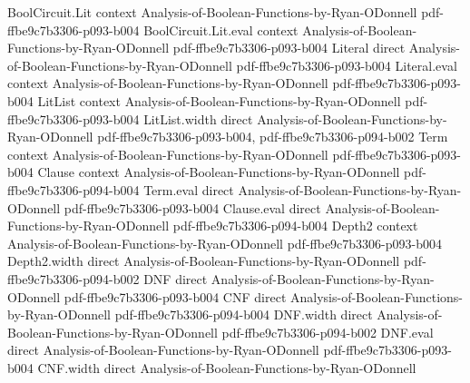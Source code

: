 \begin{lemma}
\label{BooleanAnalysis.fourierCoeff_odd_even}
\leanok
{}
\proofstep
  {BoolCircuit.Lit}
  {context}
  {Analysis-of-Boolean-Functions-by-Ryan-ODonnell}
  {pdf-ffbe9c7b3306-p093-b004}
\proofstep
  {BoolCircuit.Lit.eval}
  {context}
  {Analysis-of-Boolean-Functions-by-Ryan-ODonnell}
  {pdf-ffbe9c7b3306-p093-b004}
\proofstep
  {Literal}
  {direct}
  {Analysis-of-Boolean-Functions-by-Ryan-ODonnell}
  {pdf-ffbe9c7b3306-p093-b004}
\proofstep
  {Literal.eval}
  {context}
  {Analysis-of-Boolean-Functions-by-Ryan-ODonnell}
  {pdf-ffbe9c7b3306-p093-b004}
\proofstep
  {LitList}
  {context}
  {Analysis-of-Boolean-Functions-by-Ryan-ODonnell}
  {pdf-ffbe9c7b3306-p093-b004}
\proofstep
  {LitList.width}
  {direct}
  {Analysis-of-Boolean-Functions-by-Ryan-ODonnell}
  {pdf-ffbe9c7b3306-p093-b004,
    pdf-ffbe9c7b3306-p094-b002}
\proofstep
  {Term}
  {context}
  {Analysis-of-Boolean-Functions-by-Ryan-ODonnell}
  {pdf-ffbe9c7b3306-p093-b004}
\proofstep
  {Clause}
  {context}
  {Analysis-of-Boolean-Functions-by-Ryan-ODonnell}
  {pdf-ffbe9c7b3306-p094-b004}
\proofstep
  {Term.eval}
  {direct}
  {Analysis-of-Boolean-Functions-by-Ryan-ODonnell}
  {pdf-ffbe9c7b3306-p093-b004}
\proofstep
  {Clause.eval}
  {direct}
  {Analysis-of-Boolean-Functions-by-Ryan-ODonnell}
  {pdf-ffbe9c7b3306-p094-b004}
\proofstep
  {Depth2}
  {context}
  {Analysis-of-Boolean-Functions-by-Ryan-ODonnell}
  {pdf-ffbe9c7b3306-p093-b004}
\proofstep
  {Depth2.width}
  {direct}
  {Analysis-of-Boolean-Functions-by-Ryan-ODonnell}
  {pdf-ffbe9c7b3306-p094-b002}
\proofstep
  {DNF}
  {direct}
  {Analysis-of-Boolean-Functions-by-Ryan-ODonnell}
  {pdf-ffbe9c7b3306-p093-b004}
\proofstep
  {CNF}
  {direct}
  {Analysis-of-Boolean-Functions-by-Ryan-ODonnell}
  {pdf-ffbe9c7b3306-p094-b004}
\proofstep
  {DNF.width}
  {direct}
  {Analysis-of-Boolean-Functions-by-Ryan-ODonnell}
  {pdf-ffbe9c7b3306-p094-b002}
\proofstep
  {DNF.eval}
  {direct}
  {Analysis-of-Boolean-Functions-by-Ryan-ODonnell}
  {pdf-ffbe9c7b3306-p093-b004}
\proofstep
  {CNF.width}
  {direct}
  {Analysis-of-Boolean-Functions-by-Ryan-ODonnell}

\end{lemma}

